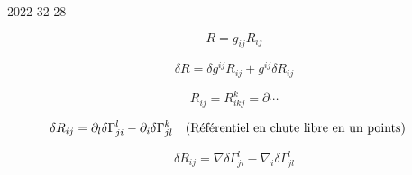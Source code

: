 


2022-32-28

$$R = g_{ij} R_{ij} $$ 

$$\delta R = \delta g^{ij} R_{ij} + g^{ij}\delta R_{ij} $$ 

$$R_{ij} = R_{ikj}^{k}= \partial\dotsb$$ 

$$\delta R_{ij} = \partial_l \delta \Gamma_{ji}^{l}- \partial_i \delta \Gamma_{jl}^{k} \qq{(Référentiel en chute libre en un points)}$$ 

$$\delta R_{ij} = \nabla \delta \Gamma_{ji}^{l}-\nabla_i \delta \Gamma_{jl}^{l}$$ 






